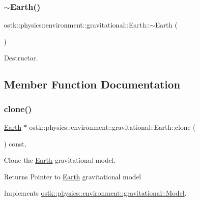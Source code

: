 \subsubsection{\texorpdfstring{$\sim$\+Earth()}{~Earth()}}
{\footnotesize\ttfamily ostk\+::physics\+::environment\+::gravitational\+::\+Earth\+::$\sim$\+Earth (\begin{DoxyParamCaption}{ }\end{DoxyParamCaption})}



Destructor. 



\subsection{Member Function Documentation}
\mbox{\label{classostk_1_1physics_1_1environment_1_1gravitational_1_1_earth_a987c2df62d8fedb368acf37e71ba7a47}} 
\subsubsection{\texorpdfstring{clone()}{clone()}}
{\footnotesize\ttfamily \hyperlink{classostk_1_1physics_1_1environment_1_1gravitational_1_1_earth}{Earth} $\ast$ ostk\+::physics\+::environment\+::gravitational\+::\+Earth\+::clone (\begin{DoxyParamCaption}{ }\end{DoxyParamCaption}) const\hspace{0.3cm}{\ttfamily [override]}, {\ttfamily [virtual]}}



Clone the \hyperlink{classostk_1_1physics_1_1environment_1_1gravitational_1_1_earth}{Earth} gravitational model. 

\begin{DoxyReturn}{Returns}
Pointer to \hyperlink{classostk_1_1physics_1_1environment_1_1gravitational_1_1_earth}{Earth} gravitational model 
\end{DoxyReturn}


Implements \hyperlink{classostk_1_1physics_1_1environment_1_1gravitational_1_1_model_a399257ac86e7f0112a702141e0e2e4a7}{ostk\+::physics\+::environment\+::gravitational\+::\+Model}.

